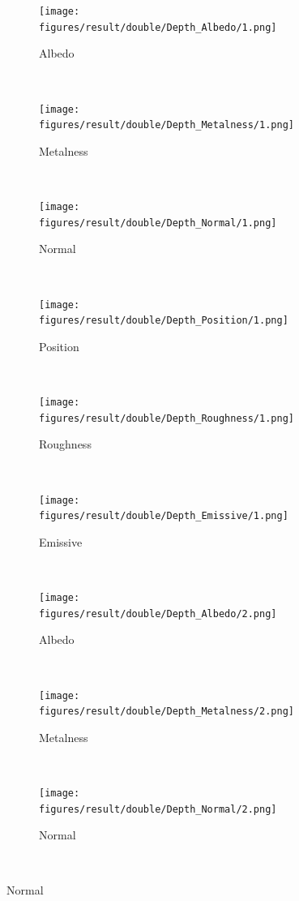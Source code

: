 \begin{figure}[h!]
    \centering
    \begin{subfigure}[b]{0.175\textwidth}
     \texttt{[image: figures/result/double/Depth\_Albedo/1.png]}
     \caption{Albedo}\label{subfig:1}
    \end{subfigure}
    ~
    \begin{subfigure}[b]{0.175\textwidth}
     \texttt{[image: figures/result/double/Depth\_Metalness/1.png]}
     \caption{Metalness}
    \end{subfigure}
    ~
    \begin{subfigure}[b]{0.175\textwidth}
     \texttt{[image: figures/result/double/Depth\_Normal/1.png]}
     \caption{Normal}
    \end{subfigure}
    \\ \vspace{0.2cm}
    \begin{subfigure}[b]{0.175\textwidth}
     \texttt{[image: figures/result/double/Depth\_Position/1.png]}
     \caption{Position}
    \end{subfigure}
    ~
    \begin{subfigure}[b]{0.175\textwidth}
     \texttt{[image: figures/result/double/Depth\_Roughness/1.png]}
     \caption{Roughness}
    \end{subfigure}
    ~
    \begin{subfigure}[b]{0.175\textwidth}
     \texttt{[image: figures/result/double/Depth\_Emissive/1.png]}
     \caption{Emissive}
     \label{subfig:double_input_base_depth_and_emissive1}
    \end{subfigure}
    \\ \vspace{0.2cm} %
    \begin{subfigure}[b]{0.175\textwidth}
     \texttt{[image: figures/result/double/Depth\_Albedo/2.png]}
     \caption{Albedo}\label{subfig:1}
    \end{subfigure}
    ~
    \begin{subfigure}[b]{0.175\textwidth}
     \texttt{[image: figures/result/double/Depth\_Metalness/2.png]}
     \caption{Metalness}
    \end{subfigure}
    ~
    \begin{subfigure}[b]{0.175\textwidth}
     \texttt{[image: figures/result/double/Depth\_Normal/2.png]}
     \caption{Normal}
    \end{subfigure}
    \\ \vspace{0.2cm}

\end{figure}
